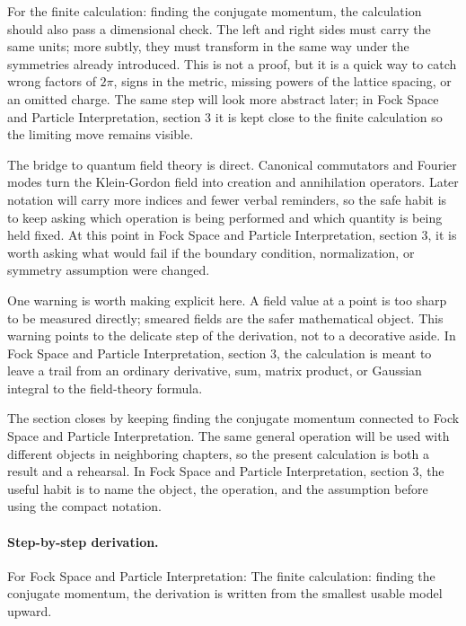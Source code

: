 For the finite calculation: finding the conjugate momentum, the calculation should also pass a dimensional check.  The left and right sides must carry the same units; more subtly, they must transform in the same way under the symmetries already introduced.  This is not a proof, but it is a quick way to catch wrong factors of \(2\pi\), signs in the metric, missing powers of the lattice spacing, or an omitted charge.  The same step will look more abstract later; in Fock Space and Particle Interpretation, section 3 it is kept close to the finite calculation so the limiting move remains visible.

The bridge to quantum field theory is direct.  Canonical commutators and Fourier modes turn the Klein-Gordon field into creation and annihilation operators.  Later notation will carry more indices and fewer verbal reminders, so the safe habit is to keep asking which operation is being performed and which quantity is being held fixed.  At this point in Fock Space and Particle Interpretation, section 3, it is worth asking what would fail if the boundary condition, normalization, or symmetry assumption were changed.

One warning is worth making explicit here.  A field value at a point is too sharp to be measured directly; smeared fields are the safer mathematical object.  This warning points to the delicate step of the derivation, not to a decorative aside.  In Fock Space and Particle Interpretation, section 3, the calculation is meant to leave a trail from an ordinary derivative, sum, matrix product, or Gaussian integral to the field-theory formula.

The section closes by keeping finding the conjugate momentum connected to Fock Space and Particle Interpretation.  The same general operation will be used with different objects in neighboring chapters, so the present calculation is both a result and a rehearsal.  In Fock Space and Particle Interpretation, section 3, the useful habit is to name the object, the operation, and the assumption before using the compact notation.



\paragraph{Step-by-step derivation.}

For Fock Space and Particle Interpretation: The finite calculation: finding the conjugate momentum, the derivation is written from the smallest usable model upward.

